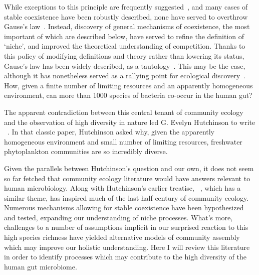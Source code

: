 \documentclass[12pt]{article}
\begin{document}
While exceptions to this principle are frequently
suggested~\citep{Koch1974a,Koch1974b},
and many cases of stable coexistence have been robustly described,
none have served to overthrow Gause's law~\citep{Hutchinson1957}.
Instead, discovery of general mechanisms of coexistence, the
most important of which are described below, have served
to refine the definition of `niche', and improved the theoretical
understanding of competition.
Thanks to this policy of modifying definitions and theory
rather than lowering its status, Gause's law has been widely described,
as a tautology~\citep{Hutchinson1961,Slobodkin1961}.
This may be the case, although it has nonetheless served as a
rallying point for ecological discovery~\citep{Armstrong1980}.
How, given a finite number of limiting resources and an apparently
homogeneous environment, can more than 1000 species of bacteria
co-occur in the human gut?

The apparent contradiction between this central tenant
of community ecology
and the observation of high diversity in nature led
G. Evelyn Hutchinson to write
~\citeyearpar{Hutchinson1961}.
In that classic paper, Hutchinson asked why,
given the apparently homogeneous environment
and small number of limiting resources,
freshwater phytoplankton communities are so incredibly diverse.

Given the parallels between Hutchinson's question and our own,
it does not seem so far fetched that community ecology literature would have
answers relevant to human microbiology.
Along with Hutchinson's earlier treatise,
~\citeyearpar{Hutchinson1959},
which has a similar theme,
 has inspired much of the
last half century of community ecology.
Numerous mechanisms allowing for stable coexistence have been
hypothesized and tested, expanding our understanding of niche
processes.
What's more, challenges to a number of assumptions implicit in our
surprised reaction to this high species richness
have yielded alternative models of community assembly
which may improve our holistic understanding.
Here I will review this literature in order to identify processes which may
contribute to the high diversity of the human gut microbiome.
\end{document}
